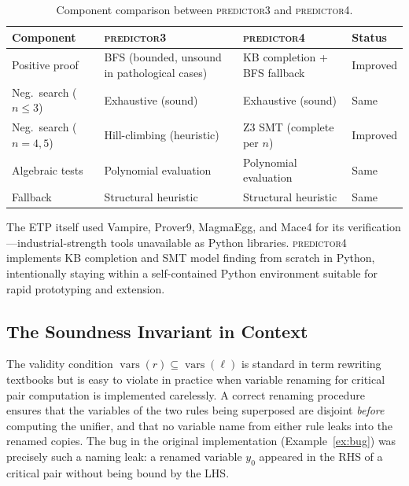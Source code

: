 \begin{table}[ht]
\centering
\caption{Component comparison between \textsc{predictor3} and \textsc{predictor4}.}
\label{tab:comparison}
\renewcommand{\arraystretch}{1.15}
\begin{tabular}{@{}lp{3.2cm}p{3.2cm}l@{}}
\toprule
\textbf{Component} & \textbf{\textsc{predictor3}} & \textbf{\textsc{predictor4}} & \textbf{Status} \\
\midrule
Positive proof & BFS (bounded, unsound in pathological cases)
               & KB completion + BFS fallback
               & Improved \\
Neg.\ search ($n \leq 3$) & Exhaustive (sound) & Exhaustive (sound) & Same \\
Neg.\ search ($n = 4, 5$) & Hill-climbing (heuristic)
               & Z3 SMT (complete per $n$)
               & Improved \\
Algebraic tests & Polynomial evaluation & Polynomial evaluation & Same \\
Fallback & Structural heuristic & Structural heuristic & Same \\
\bottomrule
\end{tabular}
\end{table}

The ETP itself used Vampire, Prover9, MagmaEgg, and Mace4 for its verification
\cite{etp2025}---industrial-strength tools unavailable as Python libraries.
\textsc{predictor4} implements KB completion and SMT model finding from scratch in
Python, intentionally staying within a self-contained Python environment suitable for
rapid prototyping and extension.

\subsection{The Soundness Invariant in Context}

The validity condition $\operatorname{vars}(r) \subseteq \operatorname{vars}(\ell)$ is standard in term
rewriting textbooks \cite{baader1999term} but is easy to violate in practice when
variable renaming for critical pair computation is implemented carelessly.  A correct
renaming procedure ensures that the variables of the two rules being superposed are
disjoint \emph{before} computing the unifier, and that no variable name from either
rule leaks into the renamed copies.  The bug in the original implementation
(Example~\ref{ex:bug}) was precisely such a naming leak: a renamed variable $y_0$
appeared in the RHS of a critical pair without being bound by the LHS.

